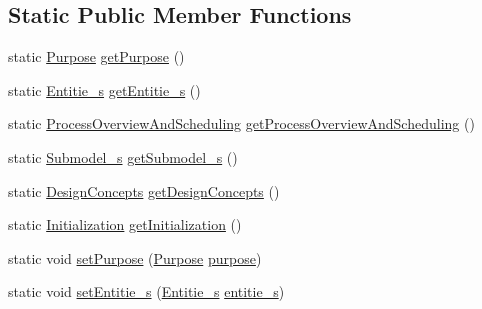 \subsection*{Static Public Member Functions}
\begin{DoxyCompactItemize}
\item 
static \hyperlink{classit_1_1isislab_1_1masonassisteddocumentation_1_1_o_d_d_1_1_purpose}{Purpose} \hyperlink{classit_1_1isislab_1_1masonassisteddocumentation_1_1_o_d_d_1_1_o_d_d_a1c268abcb00175602628e27d9746b8d7}{get\-Purpose} ()
\item 
static \hyperlink{classit_1_1isislab_1_1masonassisteddocumentation_1_1_o_d_d_1_1_entitie__s}{Entitie\-\_\-s} \hyperlink{classit_1_1isislab_1_1masonassisteddocumentation_1_1_o_d_d_1_1_o_d_d_adbe4a3c22099e15dd5e6d5ee1246e89b}{get\-Entitie\-\_\-s} ()
\item 
static \hyperlink{classit_1_1isislab_1_1masonassisteddocumentation_1_1_o_d_d_1_1_process_overview_and_scheduling}{Process\-Overview\-And\-Scheduling} \hyperlink{classit_1_1isislab_1_1masonassisteddocumentation_1_1_o_d_d_1_1_o_d_d_af7a8e37add89457f60730dd10f453870}{get\-Process\-Overview\-And\-Scheduling} ()
\item 
static \hyperlink{classit_1_1isislab_1_1masonassisteddocumentation_1_1_o_d_d_1_1_submodel__s}{Submodel\-\_\-s} \hyperlink{classit_1_1isislab_1_1masonassisteddocumentation_1_1_o_d_d_1_1_o_d_d_a09f8c9f181d998e868aa907a48bcb079}{get\-Submodel\-\_\-s} ()
\item 
static \hyperlink{classit_1_1isislab_1_1masonassisteddocumentation_1_1_o_d_d_1_1_design_concepts}{Design\-Concepts} \hyperlink{classit_1_1isislab_1_1masonassisteddocumentation_1_1_o_d_d_1_1_o_d_d_ac21d4bc44f43866a761d970d04255808}{get\-Design\-Concepts} ()
\item 
static \hyperlink{classit_1_1isislab_1_1masonassisteddocumentation_1_1_o_d_d_1_1_initialization}{Initialization} \hyperlink{classit_1_1isislab_1_1masonassisteddocumentation_1_1_o_d_d_1_1_o_d_d_a9c99f2dd81268c4114fc9171957a6bb1}{get\-Initialization} ()
\item 
static void \hyperlink{classit_1_1isislab_1_1masonassisteddocumentation_1_1_o_d_d_1_1_o_d_d_a8d0bd3c6328d40321999af84d9dfa311}{set\-Purpose} (\hyperlink{classit_1_1isislab_1_1masonassisteddocumentation_1_1_o_d_d_1_1_purpose}{Purpose} \hyperlink{classit_1_1isislab_1_1masonassisteddocumentation_1_1_o_d_d_1_1_o_d_d_aa133a32d89f92614355144075edd77c5}{purpose})
\item 
static void \hyperlink{classit_1_1isislab_1_1masonassisteddocumentation_1_1_o_d_d_1_1_o_d_d_a714c534f4a48d98d654353d38ca39c56}{set\-Entitie\-\_\-s} (\hyperlink{classit_1_1isislab_1_1masonassisteddocumentation_1_1_o_d_d_1_1_entitie__s}{Entitie\-\_\-s} \hyperlink{classit_1_1isislab_1_1masonassisteddocumentation_1_1_o_d_d_1_1_o_d_d_a49fdc3fb727fa48b968c9db5110b02c5}{entitie\-\_\-s})

\end{DoxyCompactItemize}
